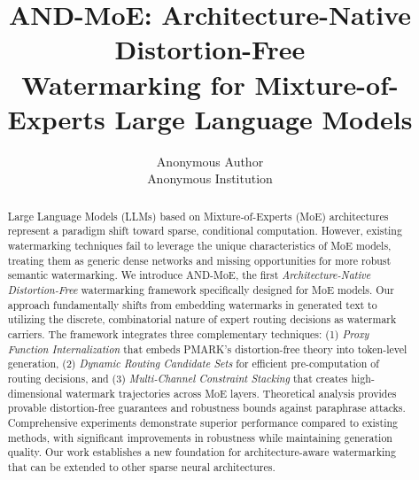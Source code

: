 \documentclass[letterpaper,twocolumn,10pt]{article}
\begin{document}

\date{}

\title{\Large \bf AND-MoE: Architecture-Native Distortion-Free\\ 
  Watermarking for Mixture-of-Experts Large Language Models}

\author{
{\rm Anonymous Author}\\
Anonymous Institution
}

\maketitle

\begin{abstract}
Large Language Models (LLMs) based on Mixture-of-Experts (MoE) architectures represent a paradigm shift toward sparse, conditional computation. However, existing watermarking techniques fail to leverage the unique characteristics of MoE models, treating them as generic dense networks and missing opportunities for more robust semantic watermarking. We introduce AND-MoE, the first \textit{Architecture-Native Distortion-Free} watermarking framework specifically designed for MoE models. Our approach fundamentally shifts from embedding watermarks in generated text to utilizing the discrete, combinatorial nature of expert routing decisions as watermark carriers. The framework integrates three complementary techniques: (1) \textit{Proxy Function Internalization} that embeds PMARK's distortion-free theory into token-level generation, (2) \textit{Dynamic Routing Candidate Sets} for efficient pre-computation of routing decisions, and (3) \textit{Multi-Channel Constraint Stacking} that creates high-dimensional watermark trajectories across MoE layers. Theoretical analysis provides provable distortion-free guarantees and robustness bounds against paraphrase attacks. Comprehensive experiments demonstrate superior performance compared to existing methods, with significant improvements in robustness while maintaining generation quality. Our work establishes a new foundation for architecture-aware watermarking that can be extended to other sparse neural architectures.
\end{abstract}
\end{document}
